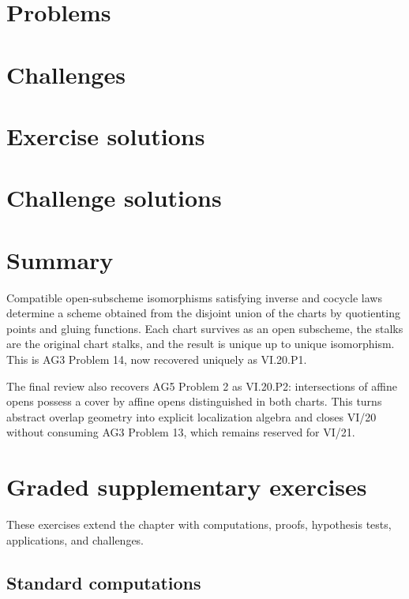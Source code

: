 \section{Problems}


\section{Challenges}


\ifdefined\IncludeExerciseSolutions
\section{Exercise solutions}

\fi
\ifdefined\IncludeChallengeSolutions
\section{Challenge solutions}

\fi

\section*{Summary}

Compatible open-subscheme isomorphisms satisfying inverse and cocycle laws determine a scheme
obtained from the disjoint union of the charts by quotienting points and gluing functions.  Each
chart survives as an open subscheme, the stalks are the original chart stalks, and the result is
unique up to unique isomorphism.  This is AG3 Problem 14, now recovered uniquely as VI.20.P1.

The final review also recovers AG5 Problem 2 as VI.20.P2: intersections of affine opens possess a
cover by affine opens distinguished in both charts.  This turns abstract overlap geometry into
explicit localization algebra and closes VI/20 without consuming AG3 Problem 13, which remains
reserved for VI/21.
\section{Graded supplementary exercises}
These exercises extend the chapter with computations, proofs, hypothesis tests, applications, and challenges.

\subsection*{Standard computations}

